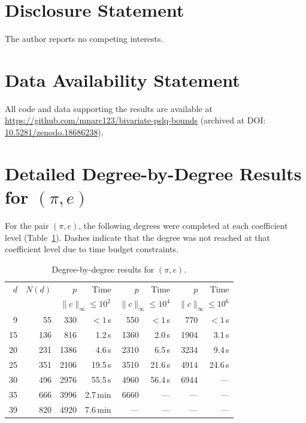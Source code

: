 \documentclass[11pt]{amsart}
\theoremstyle{remark}
\newcommand{\norm}[1]{\lVert #1 \rVert}
\begin{document}
\section*{Disclosure Statement}
The author reports no competing interests.

\section*{Data Availability Statement}
All code and data supporting the results are available at
\url{https://github.com/mnarc123/bivariate-pslq-bounds}
(archived at DOI: \href{https://doi.org/10.5281/zenodo.18686238}%
{10.5281/zenodo.18686238}).

\appendix
\section{Detailed Degree-by-Degree Results for $(\pi,e)$}\label{app:detailed}

For the pair $(\pi,e)$, the following degrees were completed at each coefficient
level (Table~\ref{tab:detailed}). Dashes indicate that the degree was not reached at
that coefficient level due to time budget constraints.

\begin{table}[ht]
\centering
\caption{Degree-by-degree results for $(\pi,e)$.}\label{tab:detailed}
\smallskip
\begin{tabular}{@{}r r rr rr rr@{}}
\toprule
$d$ & $N(d)$
  & $p$ & Time
  & $p$ & Time
  & $p$ & Time \\
  & & \multicolumn{2}{c}{\scriptsize$\norm{c}_\infty\!\le\!10^2$}
  & \multicolumn{2}{c}{\scriptsize$\norm{c}_\infty\!\le\!10^4$}
  & \multicolumn{2}{c}{\scriptsize$\norm{c}_\infty\!\le\!10^6$} \\
\midrule
 9 &  55 &   330 & ${<}1$\,s &   550 & ${<}1$\,s &   770 & ${<}1$\,s \\
15 & 136 &   816 & 1.2\,s    &  1360 & 2.0\,s    &  1904 & 3.1\,s \\
20 & 231 &  1386 & 4.6\,s    &  2310 & 6.5\,s    &  3234 & 9.4\,s \\
25 & 351 &  2106 & 19.5\,s   &  3510 & 21.6\,s   &  4914 & 24.6\,s \\
30 & 496 &  2976 & 55.5\,s   &  4960 & 56.4\,s   &  6944 & --- \\
35 & 666 &  3996 & 2.7\,min  &  6660 & ---        &  ---  & --- \\
39 & 820 &  4920 & 7.6\,min  &  ---  & ---        &  ---  & --- \\
\bottomrule
\end{tabular}
\end{table}
\end{document}
